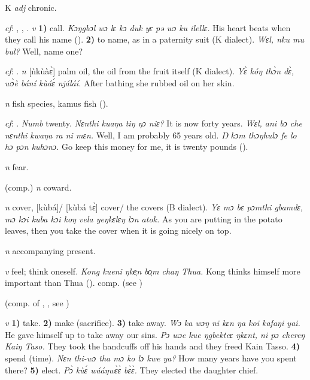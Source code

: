 \begin{letter}{K}
 \textit{adj} chronic.

 \textit{cf}: , , . \textit{v} \textbf{1)} call. \textit{Kɔŋgbɔl wɔ lɛ kɔ duk yɛ pə wɔ ku ilellɛ.} His heart beats when they call his name (\citealt{Pichl1967}). \textbf{2)} to name, as in a paternity suit (K dialect). \textit{Wɛl, nku mu bul?} Well, name one?

 \textit{cf}: . \textit{n} [ǹkùàɛ̀] palm oil, the oil from the fruit itself (K dialect). \textit{Yɛ̀ kóŋ thɔ̀n dɛ̀, wɔ̀è bání kùáɛ́ njáláí.} After bathing she rubbed oil on her skin.

 \textit{n} fish species, kamus fish (\citealt{Pichl1967}). 

 \textit{cf}: . \textit{Numb} twenty. \textit{Nɛnthi kuaŋa tiŋ ŋɔ niɛ?} It is now forty years. \textit{Wɛl, ani bɔ che nɛnthi kwaŋa ra ni mɛn.} Well, I am probably 65 years old. \textit{Ŋ kɔm thɔŋhulɔ fe lo hɔ pɔn kuhɔnɔ.} Go keep this money for me, it is twenty pounds (\citealt{Pichl1967}). 

 \textit{n} fear.

 (comp.) \textit{n} coward.

 \textit{n} cover, [kùbá]/ [kùbá tɛ̀] cover/ the covers (B dialect). \textit{Yɛ mɔ bɛ pɔmthi gbamdɛ, mɔ kɔi kuba kɔi koŋ vela yeŋkɛlɛŋ lɔn atok.} As you are putting in the potato leaves, then you take the cover when it is going nicely on top.

 \textit{n} accompanying present.

 \textit{v} feel; think oneself. \textit{Kong kueni ŋke̹n bo̹m chaŋ Thua.} Kong thinks himself more important than Thua (\citealt{Pichl1967}). comp.  (see ) 

 (comp. of , , see ) 

 \textit{v} \textbf{1)} take. \textbf{2)} make (sacrifice). \textbf{3)} take away. \textit{Wɔ ka wɔŋ ni kɛn ŋa koi kafaŋi yai.} He gave himself up to take away our sins. \textit{Pɔ wɔe kue ŋgbekteɛ ŋkɛnt, ni pɔ chereŋ Kaiŋ Taso.} They took the handcuffs off his hands and they freed Kain Tasso. \textbf{4)} spend (time). \textit{Nɛn thi-wɔ tha mɔ ko lɔ kwe ya?} How many years have you spent there? \textbf{5)} elect. \textit{Pɔ̀ kùɛ́ wááŋwɛ̀ɛ̀ bɛ̀ɛ̀.} They elected the daughter chief.


\end{letter}
